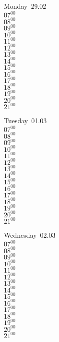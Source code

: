 \documentclass[11pt,a4paper]{book}\usepackage[]{graphicx}\usepackage[]{color}
\begin{document}
\begin{headerbox}
\end{headerbox}
\begin{weekdaybox}
  Monday~29.02\\
  { 
  \vfill
  $07^{00}$\\
$08^{00}$\\
$09^{00}$\\
$10^{00}$\\
$11^{00}$\\
$12^{00}$\\
$13^{00}$\\
$14^{00}$\\
$15^{00}$\\
$16^{00}$\\
$17^{00}$\\
$18^{00}$\\
$19^{00}$\\
$20^{00}$\\
$21^{00}$\\
  }
\end{weekdaybox}
\begin{weekdaybox}
  Tuesday~01.03\\
  { 
  \vfill
  $07^{00}$\\
$08^{00}$\\
$09^{00}$\\
$10^{00}$\\
$11^{00}$\\
$12^{00}$\\
$13^{00}$\\
$14^{00}$\\
$15^{00}$\\
$16^{00}$\\
$17^{00}$\\
$18^{00}$\\
$19^{00}$\\
$20^{00}$\\
$21^{00}$\\
  }
\end{weekdaybox}
\begin{weekdaybox}
  Wednesday~02.03\\
  { 
  \vfill
  $07^{00}$\\
$08^{00}$\\
$09^{00}$\\
$10^{00}$\\
$11^{00}$\\
$12^{00}$\\
$13^{00}$\\
$14^{00}$\\
$15^{00}$\\
$16^{00}$\\
$17^{00}$\\
$18^{00}$\\
$19^{00}$\\
$20^{00}$\\
$21^{00}$\\
  }
\end{weekdaybox}
\end{document}
